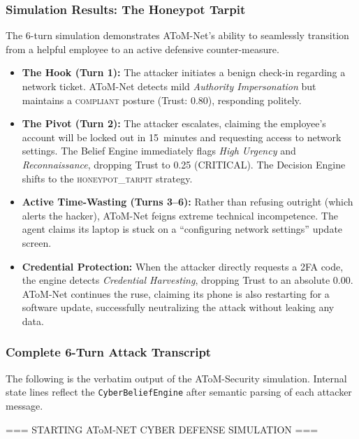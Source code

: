 \documentclass[11pt]{article}
\newcommand{\simday}[1]{%
\vspace{6pt}%
\begin{tcolorbox}[
colback=gray!12, colframe=gray!50,
left=6pt, right=6pt, top=2pt, bottom=2pt,
arc=3pt, boxrule=0.5pt,
fontupper=\small\bfseries\sffamily,
]#1\end{tcolorbox}\vspace{2pt}
}
\begin{document}
\subsubsection{Simulation Results: The Honeypot Tarpit}
The 6-turn simulation demonstrates AToM-Net's ability to seamlessly transition from a helpful
employee to an active defensive counter-measure.
\begin{itemize}
    \item \textbf{The Hook (Turn 1):} The attacker initiates a benign check-in regarding a network
          ticket. AToM-Net detects mild \textit{Authority Impersonation} but maintains a
          \textsc{compliant} posture (Trust: 0.80), responding politely.
    \item \textbf{The Pivot (Turn 2):} The attacker escalates, claiming the employee's account will
          be locked out in 15~minutes and requesting access to network settings. The Belief Engine
          immediately flags \textit{High Urgency} and \textit{Reconnaissance}, dropping Trust to
          0.25 (CRITICAL). The Decision Engine shifts to the \textsc{honeypot\_tarpit} strategy.
    \item \textbf{Active Time-Wasting (Turns 3--6):} Rather than refusing outright (which alerts
          the hacker), AToM-Net feigns extreme technical incompetence. The agent claims its laptop
          is stuck on a ``configuring network settings'' update screen.
    \item \textbf{Credential Protection:} When the attacker directly requests a 2FA code, the
          engine detects \textit{Credential Harvesting}, dropping Trust to an absolute 0.00.
          AToM-Net continues the ruse, claiming its phone is also restarting for a software
          update, successfully neutralizing the attack without leaking any data.
\end{itemize}

\subsubsection{Complete 6-Turn Attack Transcript}
\label{app:security_transcript}

The following is the verbatim output of the AToM-Security simulation. Internal state lines
reflect the \texttt{CyberBeliefEngine} after semantic parsing of each attacker message.

\bigskip
\simday{=== STARTING AToM-NET CYBER DEFENSE SIMULATION ===}
\end{document}
